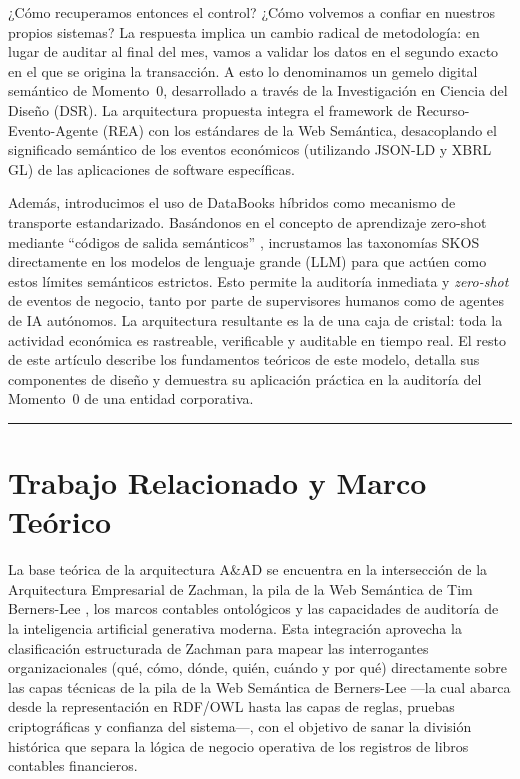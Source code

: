 \documentclass[12pt, a4paper]{article}
\begin{document}
¿Cómo recuperamos entonces el control? ¿Cómo volvemos a confiar en nuestros propios sistemas? La respuesta implica un cambio radical de metodología: en lugar de auditar al final del mes, vamos a validar los datos en el segundo exacto en el que se origina la transacción. A esto lo denominamos un gemelo digital semántico de Momento~0, desarrollado a través de la Investigación en Ciencia del Diseño (DSR). La arquitectura propuesta integra el framework de Recurso-Evento-Agente (REA) con los estándares de la Web Semántica, desacoplando el significado semántico de los eventos económicos (utilizando JSON-LD y XBRL GL) de las aplicaciones de software específicas.

Además, introducimos el uso de DataBooks híbridos \cite{cagle2026} como mecanismo de transporte estandarizado. Basándonos en el concepto de aprendizaje zero-shot mediante ``códigos de salida semánticos'' \cite{palatucci2009}, incrustamos las taxonomías SKOS \cite{w3cskos} directamente en los modelos de lenguaje grande (LLM) para que actúen como estos límites semánticos estrictos. Esto permite la auditoría inmediata y \textit{zero-shot} de eventos de negocio, tanto por parte de supervisores humanos como de agentes de IA autónomos. La arquitectura resultante es la de una caja de cristal: toda la actividad económica es rastreable, verificable y auditable en tiempo real. El resto de este artículo describe los fundamentos teóricos de este modelo, detalla sus componentes de diseño y demuestra su aplicación práctica en la auditoría del Momento~0 de una entidad corporativa.

\hrule
\vspace{1em}

\section{Trabajo Relacionado y Marco Teórico}

La base teórica de la arquitectura A\&AD se encuentra en la intersección de la Arquitectura Empresarial de Zachman, la pila de la Web Semántica de Tim Berners-Lee \cite{bernerslee2001}, los marcos contables ontológicos y las capacidades de auditoría de la inteligencia artificial generativa moderna. Esta integración aprovecha la clasificación estructurada de Zachman para mapear las interrogantes organizacionales (qué, cómo, dónde, quién, cuándo y por qué) directamente sobre las capas técnicas de la pila de la Web Semántica de Berners-Lee ---la cual abarca desde la representación en RDF/OWL hasta las capas de reglas, pruebas criptográficas y confianza del sistema---, con el objetivo de sanar la división histórica que separa la lógica de negocio operativa de los registros de libros contables financieros.
\end{document}
